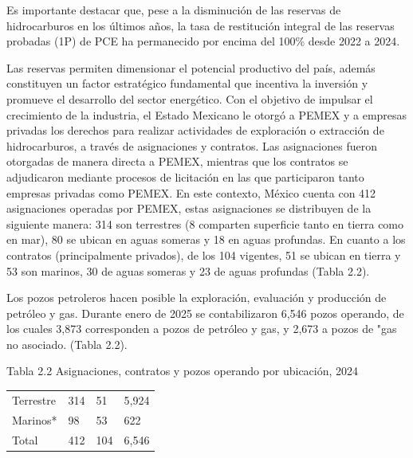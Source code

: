 \documentclass{sener2025}
\begin{document}
Es importante destacar que, pese a la disminución de las reservas de hidrocarburos en los últimos años, la tasa de restitución integral de las reservas probadas (1P) de PCE ha permanecido por encima del 100\% desde 2022 a 2024.

Las reservas permiten dimensionar el potencial productivo del país, además constituyen un factor estratégico fundamental que incentiva la inversión y promueve el desarrollo del sector energético. Con el objetivo de impulsar el crecimiento de la industria, el Estado Mexicano le otorgó a PEMEX y a empresas privadas los derechos para realizar actividades de exploración o extracción de hidrocarburos, a través de asignaciones y contratos. Las asignaciones fueron otorgadas de manera directa a PEMEX, mientras que los contratos se adjudicaron mediante procesos de licitación en las que participaron tanto empresas privadas como PEMEX. En este contexto, México cuenta con 412 asignaciones operadas por PEMEX, estas asignaciones se distribuyen de la siguiente manera: 314 son terrestres (8 comparten superficie tanto en tierra como en mar), 80 se ubican en aguas someras y 18 en aguas profundas. En cuanto a los contratos (principalmente privados), de los 104 vigentes, 51 se ubican en tierra y 53 son marinos, 30 de aguas someras y 23 de aguas profundas (Tabla 2.2).

Los pozos petroleros hacen posible la exploración, evaluación y producción de petróleo y gas. Durante enero de 2025 se contabilizaron 6,546 pozos operando, de los cuales 3,873 corresponden a pozos de petróleo y gas, y 2,673 a pozos de "gas no asociado. (Tabla 2.2).

\begin{tabladoradoCorto}
  \caption{Tabla 2.2 Asignaciones, contratos y pozos operando por ubicación, 2024}
  \label{tab:tabla_2_2_asignaciones__contra}
  \begin{tabularx}{\textwidth}{Vvvv}
    \toprule
      &  &  &  \\
    \midrule
    Terrestre & 314 & 51 & 5,924 \\
    Marinos* & 98 & 53 & 622 \\
    Total & 412 & 104 & 6,546 \\
    \bottomrule
  \end{tabularx}
\end{tabladoradoCorto}
\vspace{-4pt}
\end{document}

